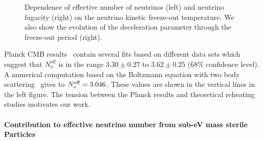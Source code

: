 \begin{figure}
\begin{minipage}{\linewidth}
\caption{Dependence of  effective number of neutrinos (left) and neutrino fugacity (right) on the neutrino kinetic freeze-out temperature. We also show the evolution of the deceleration parameter through the freeze-out period (right).}
\end{minipage}
\label{fig:Tk_dependence}
\end{figure}
 
 Planck CMB results~\cite{Planck:2013pxb}  contain several fits based on different data sets which suggest that $N^{\mathrm{eff}}_\nu$ is in the range $3.30\pm 0.27$ to $3.62\pm0.25$ ($68\%$ confidence level). A numerical computation based on the Boltzmann equation with two body scattering~\cite{Mangano:2005cc} gives to $N_{\nu}^{\rm eff}=3.046$. These values are shown in the vertical lines in the left figure. The tension between the Planck results and theoretical reheating studies motivates our work.

\paragraph{Contribution to effective neutrino number from sub-eV mass sterile Particles}%


